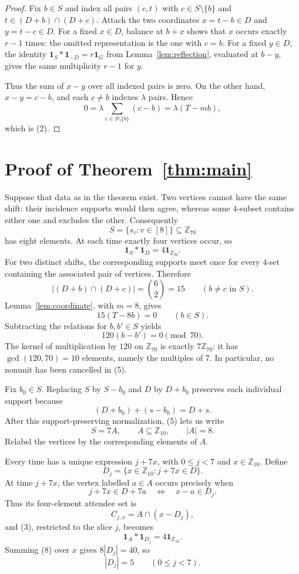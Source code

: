 \documentclass[11pt]{article}
\newcommand{\Z}{\mathbb Z}
\newcommand{\ind}{\mathbf 1}
\begin{document}
\begin{proof}
Fix $b\in S$ and index all pairs $(c,t)$ with $c\in S\setminus\{b\}$
and $t\in(D+b)\cap(D+c)$.  Attach the two coordinates
$x=t-b\in D$ and $y=t-c\in D$.  For a fixed $x\in D$, balance at $b+x$
shows that $x$ occurs exactly $r-1$ times: the omitted representation is
the one with $c=b$.  For a fixed $y\in D$, the identity
$\ind_S*\ind_{-D}=r\ind_G$ from Lemma~\ref{lem:reflection}, evaluated at
$b-y$, gives the same multiplicity $r-1$ for $y$.

Thus the sum of $x-y$ over all indexed pairs is zero.  On the other hand,
$x-y=c-b$, and each $c\ne b$ indexes $\lambda$ pairs.  Hence
\[
 0=\lambda\sum_{c\in S\setminus\{b\}}(c-b)
  =\lambda(T-mb),
\]
which is (2).
\end{proof}

\section{Proof of Theorem~\ref{thm:main}}

Suppose that data as in the theorem exist.  Two vertices cannot have the
same shift: their incidence supports would then agree, whereas some
$4$-subset contains either one and excludes the other.  Consequently
\[
 S=\{s_v:v\in[8]\}\subseteq\Z_{70}
\]
has eight elements.  At each time exactly four vertices occur, so
\[
 \ind_S*\ind_D=4\ind_{\Z_{70}}.                          \tag{3}
\]
For two distinct shifts, the corresponding supports meet once for every
$4$-set containing the associated pair of vertices.  Therefore
\[
 |(D+b)\cap(D+c)|=\binom62=15\qquad(b\ne c\text{ in }S). \tag{4}
\]
Lemma~\ref{lem:coordinate}, with $m=8$, gives
\[
 15(T-8b)=0\qquad(b\in S).
\]
Subtracting the relations for $b,b'\in S$ yields
\[
 120(b-b')=0\pmod {70}.                                  \tag{5}
\]
The kernel of multiplication by $120$ on $\Z_{70}$ is exactly
$7\Z_{70}$: it has $\gcd(120,70)=10$ elements, namely the multiples of
$7$.  In particular, no nonunit has been cancelled in (5).

Fix $b_0\in S$.  Replacing $S$ by $S-b_0$ and $D$ by $D+b_0$ preserves
each individual support because
\[
 (D+b_0)+(s-b_0)=D+s.
\]
After this support-preserving normalization, (5) lets us write
\[
 S=7A,\qquad A\subseteq\Z_{10},\qquad |A|=8.             \tag{6}
\]
Relabel the vertices by the corresponding elements of $A$.

Every time has a unique expression $j+7x$, with $0\le j<7$ and
$x\in\Z_{10}$.  Define
\[
 D_j=\{x\in\Z_{10}:j+7x\in D\}.
\]
At time $j+7x$, the vertex labelled $a\in A$ occurs precisely when
\[
 j+7x\in D+7a
 \quad\Longleftrightarrow\quad x-a\in D_j.
\]
Thus its four-element attendee set is
\[
 C_{j,x}=A\cap(x-D_j),                                   \tag{7}
\]
and (3), restricted to the slice $j$, becomes
\[
 \ind_A*\ind_{D_j}=4\ind_{\Z_{10}}.                     \tag{8}
\]
Summing (8) over $x$ gives $8|D_j|=40$, so
\[
 |D_j|=5\qquad(0\le j<7).                               \tag{9}
\]
\end{document}
